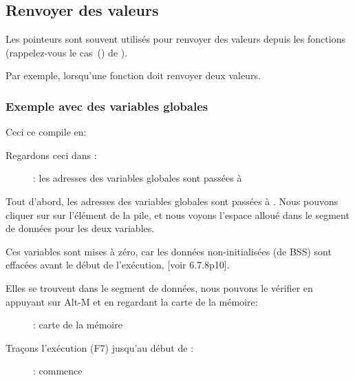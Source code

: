 \subsection{Renvoyer des valeurs}

Les pointeurs sont souvent utilisés pour renvoyer des valeurs depuis les fonctions
(rappelez-vous le cas~() de \scanf).

Par exemple, lorsqu'une fonction doit renvoyer deux valeurs.

\subsubsection{Exemple avec des variables globales}



Ceci ce compile en:



\myindex{\olly}
\clearpage
Regardons ceci dans \olly:

\begin{figure}[H]
\centering
{}
\caption{\olly: 
les adresses des variables globales sont passées à \ttfone}
\label{fig:pointers_olly_global_1}
\end{figure}

Tout d'abord, les adresses des variables globales sont passées à \ttfone.
Nous pouvons cliquer sur 
sur l'élément de la pile, et nous voyons l'espace alloué dans le segment de données
pour les deux variables.

\clearpage
Ces variables sont mises à zéro, car les données non-initialisées (de
\ac{BSS}) sont effacées avant le début de l'exécution, [voir \CNineNineStd{} 6.7.8p10].

Elles se trouvent dans le segment de données, nous pouvons le vérifier en appuyant
sur Alt-M et en regardant la carte de la mémoire:

\begin{figure}[H]
\centering
{}
\caption{\olly: carte de la mémoire}
\label{fig:pointers_olly_global_5}
\end{figure}

\clearpage
Traçons l'exécution (F7) jusqu'au début de \ttfone:

\begin{figure}[H]
\centering
{}
\caption{\olly: \ttfone commence}
\label{fig:pointers_olly_global_2}
\end{figure}

